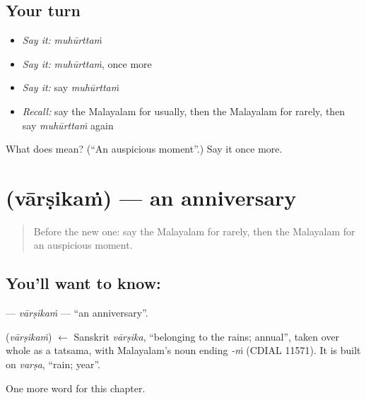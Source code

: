 \subsection*{Your turn}
\begin{itemize}
\raggedright
  \item \emph{Say it:} \emph{muhūrttaṁ}
  \item \emph{Say it:} \emph{muhūrttaṁ}, once more
  \item \emph{Say it:} say \emph{muhūrttaṁ}
  \item \emph{Recall:} say the Malayalam for usually, then the Malayalam for rarely, then say \emph{muhūrttaṁ} again
\end{itemize}

\begin{tcolorbox}[breakable,colback=teal!4,colframe=teal!35!black,title={Before you move on}]
What does  mean? (\textquotedblleft{}An auspicious moment\textquotedblright{}.) Say it once more.
\end{tcolorbox}
\section[\texorpdfstring{\ml{വാർഷികം} (vārṣikaṁ)}{വാർഷികം (vārṣikaṁ)}]{ (vārṣikaṁ) — an anniversary}

\label{lesson:ML-C277-varsikam}



\begin{quote}
Before the new one: say the Malayalam for rarely, then the Malayalam for an auspicious moment.
\end{quote}

\subsection*{You'll want to know: }
\textbf{} — \emph{vārṣikaṁ} — \textquotedblleft{}an anniversary\textquotedblright{}.

\begin{cousinweb}
\textbf{} (\emph{vārṣikaṁ}) $\leftarrow$ Sanskrit \emph{vārṣika}, \textquotedblleft{}belonging to the rains; annual\textquotedblright{}, taken over whole as a tatsama, with Malayalam's noun ending \emph{-ṁ} (CDIAL 11571). It is built on \emph{varṣa}, \textquotedblleft{}rain; year\textquotedblright{}.
\end{cousinweb}

\begin{grammarlens}[title={What you've built}]
One more word for this chapter.
\end{grammarlens}

